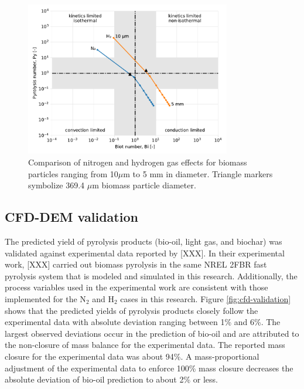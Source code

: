 \begin{figure}[H]
    \centering
    \includegraphics[width=0.8\textwidth]{figures/biot-pyro-diams.pdf}
    \caption{Comparison of nitrogen and hydrogen gas effects for biomass particles ranging from 10$\mu$m to 5 mm in diameter. Triangle markers symbolize 369.4 $\mu$m biomass particle diameter.}
    \label{fig:biot-pyro-diams}
\end{figure}


\subsection{CFD-DEM validation}

The predicted yield of pyrolysis products (bio-oil, light gas, and biochar) was validated against experimental data reported by [XXX]. In their experimental work, [XXX] carried out biomass pyrolysis in the same NREL 2FBR fast pyrolysis system that is modeled and simulated in this research. Additionally, the process variables used in the experimental work are consistent with those implemented for the N$_2$ and H$_2$ cases in this research. Figure \ref{fig:cfd-validation} shows that the predicted yields of pyrolysis products closely follow the experimental data with absolute deviation ranging between 1\% and 6\%. The largest observed deviations occur in the prediction of bio-oil and are attributed to the non-closure of mass balance for the experimental data. The reported mass closure for the experimental data was about 94\%. A mass-proportional adjustment of the experimental data to enforce 100\% mass closure decreases the absolute deviation of bio-oil prediction to about 2\% or less.

